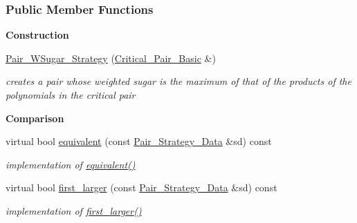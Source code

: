 \subsubsection*{Public Member Functions}
\begin{Indent}\textbf{ Construction}\par
\begin{DoxyCompactItemize}
\item 
\mbox{\label{group__strategygroup_af06bcaf5995724fe80283e20f91151b1}} 
\hyperlink{group__strategygroup_af06bcaf5995724fe80283e20f91151b1}{Pair\+\_\+\+W\+Sugar\+\_\+\+Strategy} (\hyperlink{group___g_b_computation_class_critical___pair___basic}{Critical\+\_\+\+Pair\+\_\+\+Basic} \&)
\begin{DoxyCompactList}\small\item\em creates a pair whose weighted sugar is the maximum of that of the products of the polynomials in the critical pair \end{DoxyCompactList}\end{DoxyCompactItemize}
\end{Indent}
\begin{Indent}\textbf{ Comparison}\par
\begin{DoxyCompactItemize}
\item 
\mbox{\label{group__strategygroup_a6a46188917beeab6617ff27d70356860}} 
virtual bool \hyperlink{group__strategygroup_a6a46188917beeab6617ff27d70356860}{equivalent} (const \hyperlink{group__strategygroup_class_pair___strategy___data}{Pair\+\_\+\+Strategy\+\_\+\+Data} \&sd) const
\begin{DoxyCompactList}\small\item\em implementation of \hyperlink{group__strategygroup_a6a46188917beeab6617ff27d70356860}{equivalent()} \end{DoxyCompactList}\item 
\mbox{\label{group__strategygroup_afe1c908cbb040ee318bed323395c0441}} 
virtual bool \hyperlink{group__strategygroup_afe1c908cbb040ee318bed323395c0441}{first\+\_\+larger} (const \hyperlink{group__strategygroup_class_pair___strategy___data}{Pair\+\_\+\+Strategy\+\_\+\+Data} \&sd) const
\begin{DoxyCompactList}\small\item\em implementation of \hyperlink{group__strategygroup_afe1c908cbb040ee318bed323395c0441}{first\+\_\+larger()} \end{DoxyCompactList}\end{DoxyCompactItemize}
\end{Indent}
